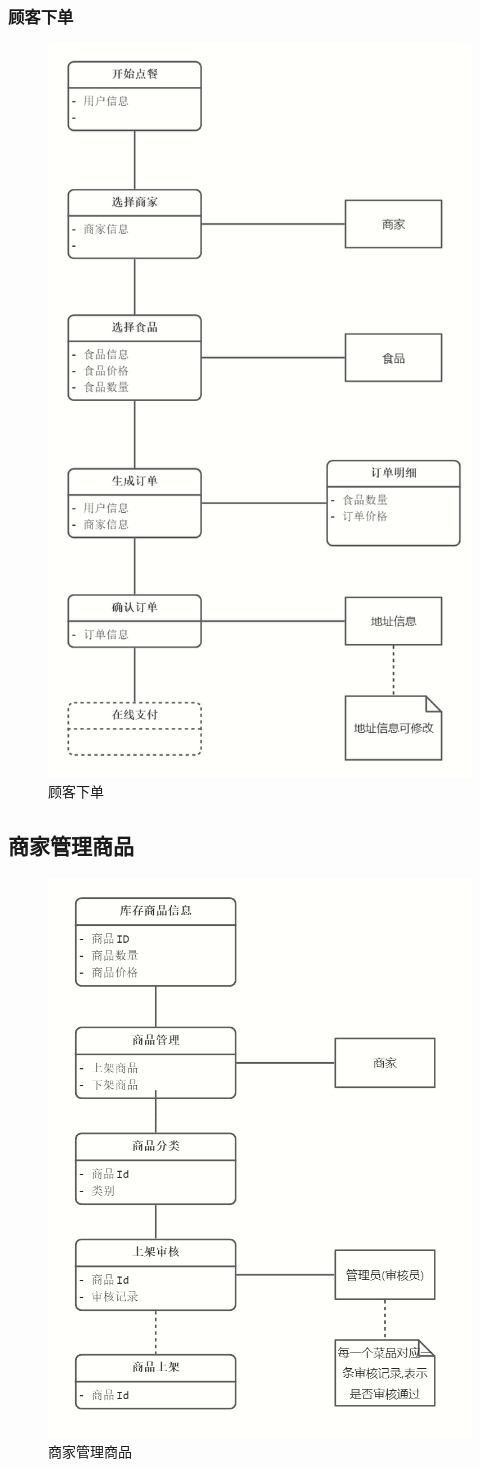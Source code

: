 \subsubsection{顾客下单}
\begin{figure}[h]
    \centering
    \includegraphics[width=0.7\linewidth]{pics/3.png}
    \caption{顾客下单}
    \label{fig:gkxd}
\end{figure}

\subsection{商家管理商品}

\begin{figure}[H]
    \centering
    \includegraphics[width=0.4\linewidth]{pics/4.png}
    \caption{商家管理商品}
    \label{fig:sjglsp}
\end{figure}

